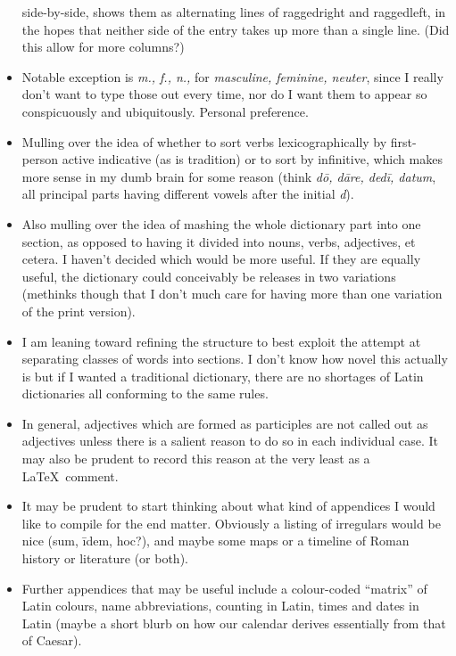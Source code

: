 \begin{itemize}
    side-by-side, shows them as alternating lines of raggedright
    and raggedleft, in the hopes that neither side of the entry
    takes up more than a single line.  (Did this allow for more
    columns?)
  \item Notable exception is \textit{m., f., n.,} for \textit{%
    masculine, feminine, neuter}, since I really don't want to
    type those out every time, nor do I want them to appear so
    conspicuously and ubiquitously.  Personal preference.
  \item Mulling over the idea of whether to sort verbs
    lexicographically by first-person active indicative (as
    is tradition) or to sort by infinitive, which makes
    more sense in my dumb brain for some reason (think
    \textit{d\=o, d\=are, ded\=i, datum}, all principal parts
    having different vowels after the initial \textit{d}).
  \item Also mulling over the idea of mashing the whole
    dictionary part into one section, as opposed to having
    it divided into nouns, verbs, adjectives, et cetera.
    I haven't decided which would be more useful.  If they
    are equally useful, the dictionary could conceivably
    be releases in two variations (methinks though that I
    don't much care for having more than one variation of
    the print version).
  \item I am leaning toward refining the structure to best
    exploit the attempt at separating classes of words into
    sections.  I don't know how novel this actually is but
    if I wanted a traditional dictionary, there are no
    shortages of Latin dictionaries all conforming to the
    same rules.
  \item In general, adjectives which are formed as
    participles are not called out as adjectives unless
    there is a salient reason to do so in each individual
    case.  It may also be prudent to record this reason
    at the very least as a \LaTeX~comment.
  \item It may be prudent to start thinking about what kind
    of appendices I would like to compile for the end
    matter.  Obviously a listing of irregulars would be
    nice (sum, \=idem, hoc?), and maybe some maps or a
    timeline of Roman history or literature (or both).
  \item Further appendices that may be useful include a
    colour-coded ``matrix'' of Latin colours, name
    abbreviations, counting in Latin, times and dates
    in Latin (maybe a short blurb on how our calendar
    derives essentially from that of Caesar).
\end{itemize}
